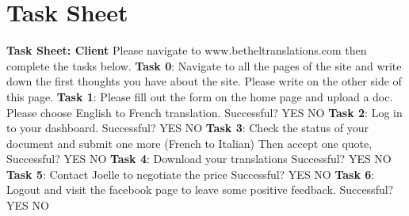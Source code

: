 \documentclass{l3proj}
\begin{document}
 \section{Task Sheet}
\textbf{Task Sheet: Client}\newline 
Please navigate to www.betheltranslations.com then complete the tasks below. \newline \newline
\textbf{Task 0}: Navigate to all the pages of the site and write down the first thoughts you have about the site. Please write on the other side of this page. \newline \newline
\textbf{Task 1}: Please fill out the form on the home page and upload a doc. Please choose English to French translation. \newline \newline
Successful?    YES      NO \newline \newline
\textbf{Task 2}: Log in to your dashboard.  \newline \newline
Successful?    YES      NO \newline \newline
\textbf{Task 3}: Check the status of your document and submit one more (French to Italian) Then accept one quote, \newline \newline
Successful?    YES      NO \newline \newline
\textbf{Task 4}: Download your translations \newline \newline
Successful?    YES      NO \newline \newline
\textbf{Task 5}: Contact Joelle to negotiate the price \newline \newline
Successful?    YES      NO \newline \newline
\textbf{Task 6}: Logout and visit the facebook page to leave some positive feedback. \newline \newline
Successful?    YES      NO \newline \newline
 
 
    
\end{document}
